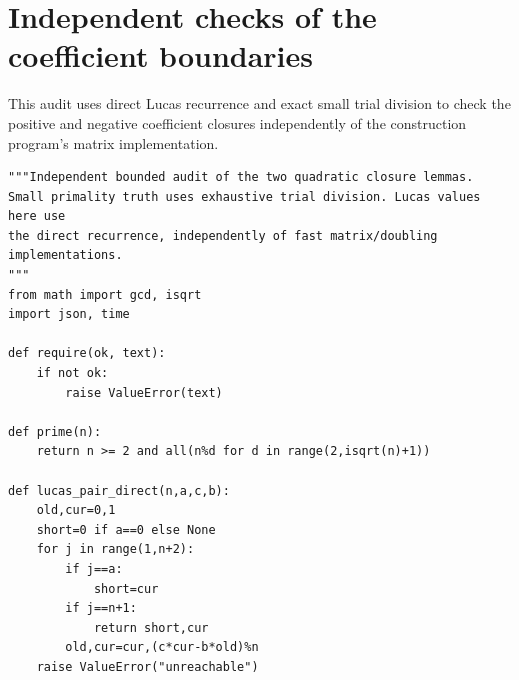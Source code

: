 \documentclass[11pt,a4paper]{article}
\theoremstyle{definition}\newtheorem{definition}[theorem]{Definition}
\theoremstyle{remark}\newtheorem{remark}[theorem]{Remark}
\begin{document}
\clearpage
\section{Independent checks of the coefficient boundaries}
\label{app:boundary-audit}

This audit uses direct Lucas recurrence and exact small trial division to check the positive and negative coefficient closures independently of the construction program's matrix implementation.

\begin{lstlisting}[label=lst:boundary-audit]
"""Independent bounded audit of the two quadratic closure lemmas.
Small primality truth uses exhaustive trial division. Lucas values here use
the direct recurrence, independently of fast matrix/doubling implementations.
"""
from math import gcd, isqrt
import json, time

def require(ok, text):
    if not ok:
        raise ValueError(text)

def prime(n):
    return n >= 2 and all(n%d for d in range(2,isqrt(n)+1))

def lucas_pair_direct(n,a,c,b):
    old,cur=0,1
    short=0 if a==0 else None
    for j in range(1,n+2):
        if j==a:
            short=cur
        if j==n+1:
            return short,cur
        old,cur=cur,(c*cur-b*old)%n
    raise ValueError("unreachable")


\end{lstlisting}
\end{document}
